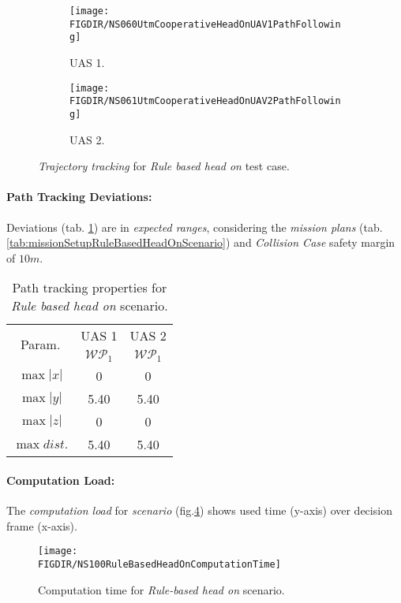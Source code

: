\begin{figure}[H]
	\centering
    \begin{subfigure}{0.48\textwidth}
    	\centering
        \texttt{[image: \\FIGDIR/NS060UtmCooperativeHeadOnUAV1PathFollowing]}
        \caption{UAS 1.}
        \label{fig:ruleBasedHeadOnUAS1PathTracking}
    \end{subfigure}
    \begin{subfigure}{0.48\textwidth}
    	\centering
        \texttt{[image: \\FIGDIR/NS061UtmCooperativeHeadOnUAV2PathFollowing]} 
        \caption{UAS 2.}
        \label{fig:ruleBasedHeadOnUAS2PathTracking}
    \end{subfigure}
    \caption{\emph{Trajectory tracking} for \emph{Rule based head on} test case. }
    \label{fig:ruleBasedHeadOnTrajectoryTrackingPerformance}
\end{figure}

\paragraph{Path Tracking Deviations:} Deviations (tab. \ref{tab:pathTrackingParametersForRuleBasedHeadOn}) are in \emph{expected ranges}, considering the \emph{mission plans} (tab. \ref{tab:missionSetupRuleBasedHeadOnScenario}) and \emph{Collision Case} safety margin of $10 m$.

\begin{table}[H]
    \centering
    \begin{tabular}{c||c|c}
        \multirow{2}{*}{Param.} & UAS 1     & UAS 2              \\\cline{2-3}
                        & $\mathscr{WP}_1$  & $\mathscr{WP}_1$   \\\hline\hline
          $\max |x|$    & 0                 & 0                  \\\hline
          $\max |y|$    & 5.40              & 5.40              \\\hline
          $\max |z|$    & 0                 & 0                  \\\hline
          $\max dist.$  & 5.40              & 5.40              \\
    \end{tabular}
    \caption{Path tracking properties for \emph{Rule based head on} scenario.}
    \label{tab:pathTrackingParametersForRuleBasedHeadOn}
\end{table}

\paragraph{Computation Load:} The \emph{computation load} for \emph{scenario} (fig.\ref{fig:ruleBasedHeadOnComputationTime}) shows used time (y-axis) over decision frame (x-axis).

\begin{figure}[H]
    \centering
    \texttt{[image: \\FIGDIR/NS100RuleBasedHeadOnComputationTime]} 
    \caption{Computation time for \emph{Rule-based head on} scenario.}
    \label{fig:ruleBasedHeadOnComputationTime}
\end{figure}